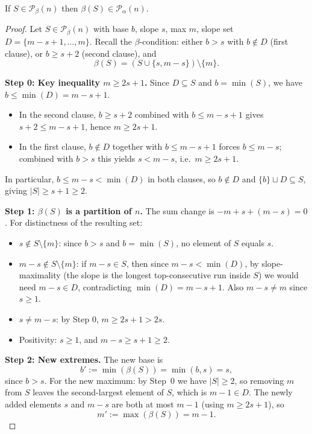 \begin{lemma}\label{lemma:beta-lands-in-alpha}\leanok
 If $S\in \mathcal{P}_\beta(n)$ then $\beta (S)\in \mathcal{P}_\alpha(n)$.
\end{lemma}
\begin{proof}\leanok
Let $S \in \mathcal{P}_\beta(n)$ with base $b$, slope $s$, max $m$, slope set
$D = \{m-s+1, \ldots, m\}$. Recall the $\beta$-condition: either $b > s$ with
$b \notin D$ (first clause), or $b \geq s+2$ (second clause), and
\[
\beta(S) = (S \cup \{s, m-s\}) \setminus \{m\}.
\]

\textbf{Step 0: Key inequality $m \geq 2s+1$.} Since $D \subseteq S$ and
$b = \min(S)$, we have $b \leq \min(D) = m - s + 1$.
\begin{itemize}
  \item In the second clause, $b \geq s+2$ combined with $b \leq m-s+1$ gives
  $s+2 \leq m-s+1$, hence $m \geq 2s+1$.
  \item In the first clause, $b \notin D$ together with $b \leq m-s+1$ forces
  $b \leq m-s$; combined with $b > s$ this yields $s < m-s$, i.e.\ $m \geq 2s+1$.
\end{itemize}
In particular, $b \leq m-s < \min(D)$ in both clauses, so $b \notin D$ and
$\{b\} \sqcup D \subseteq S$, giving $|S| \geq s + 1 \geq 2$.

\textbf{Step 1: $\beta(S)$ is a partition of $n$.} The sum change is
$-m + s + (m-s) = 0$. For distinctness of the resulting set:
\begin{itemize}
  \item $s \notin S \setminus \{m\}$: since $b > s$ and $b = \min(S)$, no
  element of $S$ equals $s$.
  \item $m-s \notin S \setminus \{m\}$: if $m-s \in S$, then since
  $m - s < \min(D)$, by slope-maximality (the slope is the longest
  top-consecutive run inside $S$) we would need $m-s \in D$, contradicting
  $\min(D) = m-s+1$. Also $m-s \neq m$ since $s \geq 1$.
  \item $s \neq m-s$: by Step 0, $m \geq 2s+1 > 2s$.
  \item Positivity: $s \geq 1$, and $m - s \geq s + 1 \geq 2$.
\end{itemize}

\textbf{Step 2: New extremes.} The new base is
\[
b' := \min(\beta(S)) = \min(b, s) = s,
\]
since $b > s$. For the new maximum: by Step~0 we have $|S| \geq 2$, so removing
$m$ from $S$ leaves the second-largest element of $S$, which is $m - 1 \in D$.
The newly added elements $s$ and $m-s$ are both at most $m-1$ (using
$m \geq 2s+1$), so
\[
m' := \max(\beta(S)) = m - 1.
\]


\end{proof}
